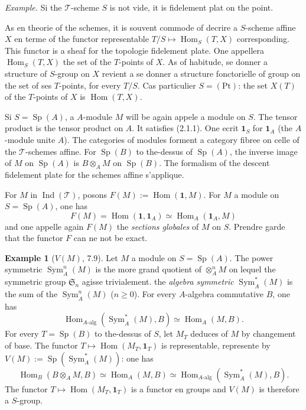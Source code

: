 \documentclass[12pt,a4paper]{article}
\theoremstyle{plain}
\theoremstyle{definition}
\newtheorem{example}[theorem]{Example}
\DeclareMathOperator{\Sp}{Sp}
\DeclareMathOperator{\Hom}{Hom}
\DeclareMathOperator{\Sym}{Sym}
\DeclareMathOperator{\Ind}{Ind}
\begin{document}
\textit{Example.} Si the $\mathcal{T}$-scheme $S$ is not vide, it is fidelement plat on the point.

As en theorie of the schemes, it is souvent commode of decrire a $S$-scheme affine $X$ en terme of the functor representable $T/S \mapsto \Hom_S(T, X)$ corresponding. This functor is a sheaf for the topologie fidelement plate. One appellera $\Hom_S(T, X)$ the set of the $T$-points of $X$. As of habitude, se donner a structure of $S$-group on $X$ revient a se donner a structure fonctorielle of group on the set of ses $T$-points, for every $T/S$. Cas particulier $S = (\mathrm{Pt})$: the set $X(T)$ of the $T$-points of $X$ is $\Hom(T, X)$.

Si $S = \Sp(A)$, a $A$-module $M$ will be again appele a module on $S$. The tensor product is the tensor product on $A$. It satisfies (2.1.1). One ecrit $\mathbf{1}_S$ for $\mathbf{1}_A$ (the $A$-module unite $A$). The categories of modules forment a category fibree on celle of the $\mathcal{T}$-schemes affine. For $\Sp(B)$ to the-dessus of $\Sp(A)$, the inverse image of $M$ on $\Sp(A)$ is $B \otimes_A M$ on $\Sp(B)$. The formalism of the descent fidelement plate for the schemes affine s'applique.

For $M$ in $\Ind(\mathcal{T})$, posons $F(M) := \Hom(\mathbf{1}, M)$. For $M$ a module on $S = \Sp(A)$, one has
\[
F(M) = \Hom(\mathbf{1}, \mathbf{1}_A) \simeq \Hom_A(\mathbf{1}_A, M)
\]
and one appelle again $F(M)$ the \emph{sections globales} of $M$ on $S$. Prendre garde that the functor $F$ can ne not be exact.

\begin{example}[$V(M)$, 7.9]
Let $M$ a module on $S = \Sp(A)$. The power symmetric $\Sym^n_A(M)$ is the more grand quotient of $\otimes^n_A M$ on lequel the symmetric group $\mathfrak{S}_n$ agisse trivialement. the \emph{algebra symmetric} $\Sym^*_A(M)$ is the sum of the $\Sym^n_A(M)$ ($n \geq 0$). For every $A$-algebra commutative $B$, one has
\[
\Hom_{A\text{-alg}}(\Sym^*_A(M), B) \simeq \Hom_A(M, B).
\]
For every $T = \Sp(B)$ to the-dessus of $S$, let $M_T$ deduces of $M$ by changement of base. The functor $T \mapsto \Hom(M_T, \mathbf{1}_T)$ is representable, represente by $V(M) := \Sp(\Sym^*_A(M))$: one has
\[
\Hom_B(B \otimes_A M, B) \simeq \Hom_A(M, B) \simeq \Hom_{A\text{-alg}}(\Sym^*_A(M), B).
\]
The functor $T \mapsto \Hom(M_T, \mathbf{1}_T)$ is a functor en groups and $V(M)$ is therefore a $S$-group.
\end{example}
\end{document}
